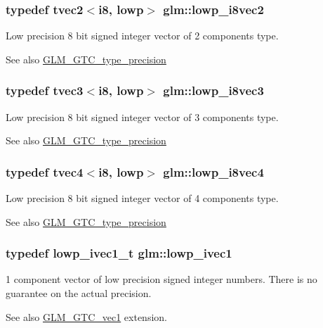 \subsubsection[{lowp\+\_\+i8vec2}]{\setlength{\rightskip}{0pt plus 5cm}typedef tvec2$<${\bf i8}, lowp$>$ {\bf glm\+::lowp\+\_\+i8vec2}}\label{namespaceglm_a51fdc711ec0659398abfa207771dfce9}
Low precision 8 bit signed integer vector of 2 components type. \begin{DoxySeeAlso}{See also}
\hyperlink{group__gtc__type__precision}{G\+L\+M\+\_\+\+G\+T\+C\+\_\+type\+\_\+precision} 
\end{DoxySeeAlso}
\hypertarget{namespaceglm_a231e6d925ce478b7effba2f622681437}{}
\subsubsection[{lowp\+\_\+i8vec3}]{\setlength{\rightskip}{0pt plus 5cm}typedef tvec3$<${\bf i8}, lowp$>$ {\bf glm\+::lowp\+\_\+i8vec3}}\label{namespaceglm_a231e6d925ce478b7effba2f622681437}
Low precision 8 bit signed integer vector of 3 components type. \begin{DoxySeeAlso}{See also}
\hyperlink{group__gtc__type__precision}{G\+L\+M\+\_\+\+G\+T\+C\+\_\+type\+\_\+precision} 
\end{DoxySeeAlso}
\hypertarget{namespaceglm_a3b9d9557da79f64eca64c8dcc15987ff}{}
\subsubsection[{lowp\+\_\+i8vec4}]{\setlength{\rightskip}{0pt plus 5cm}typedef tvec4$<${\bf i8}, lowp$>$ {\bf glm\+::lowp\+\_\+i8vec4}}\label{namespaceglm_a3b9d9557da79f64eca64c8dcc15987ff}
Low precision 8 bit signed integer vector of 4 components type. \begin{DoxySeeAlso}{See also}
\hyperlink{group__gtc__type__precision}{G\+L\+M\+\_\+\+G\+T\+C\+\_\+type\+\_\+precision} 
\end{DoxySeeAlso}
\hypertarget{namespaceglm_a5d781b915bec50a9d5b5383835035533}{}
\subsubsection[{lowp\+\_\+ivec1}]{\setlength{\rightskip}{0pt plus 5cm}typedef lowp\+\_\+ivec1\+\_\+t {\bf glm\+::lowp\+\_\+ivec1}}\label{namespaceglm_a5d781b915bec50a9d5b5383835035533}
1 component vector of low precision signed integer numbers. There is no guarantee on the actual precision. \begin{DoxySeeAlso}{See also}
\hyperlink{group__gtc__vec1}{G\+L\+M\+\_\+\+G\+T\+C\+\_\+vec1} extension. 
\end{DoxySeeAlso}
\hypertarget{namespaceglm_a4dcbb9d31820068d967a8a23086d360a}{}
